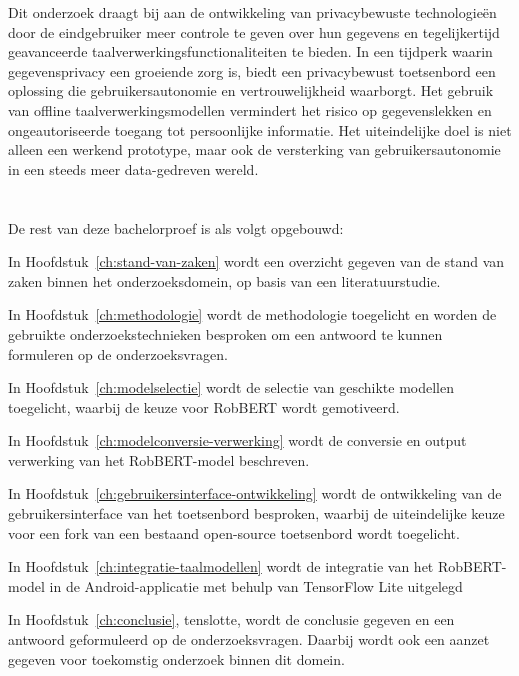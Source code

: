 Dit onderzoek draagt bij aan de ontwikkeling van privacybewuste technologieën door de eindgebruiker meer controle te geven over hun gegevens en tegelijkertijd geavanceerde taalverwerkingsfunctionaliteiten te bieden. In een tijdperk waarin gegevensprivacy een groeiende zorg is, biedt een privacybewust toetsenbord een oplossing die gebruikersautonomie en vertrouwelijkheid waarborgt. Het gebruik van offline taalverwerkingsmodellen vermindert het risico op gegevenslekken en ongeautoriseerde toegang tot persoonlijke informatie. Het uiteindelijke doel is niet alleen een werkend prototype, maar ook de versterking van gebruikersautonomie in een steeds meer data-gedreven wereld.

\section{}%
\label{sec:opzet-bachelorproef}


De rest van deze bachelorproef is als volgt opgebouwd:

In Hoofdstuk~\ref{ch:stand-van-zaken} wordt een overzicht gegeven van de stand van zaken binnen het onderzoeksdomein, op basis van een literatuurstudie.

In Hoofdstuk~\ref{ch:methodologie} wordt de methodologie toegelicht en worden de gebruikte onderzoekstechnieken besproken om een antwoord te kunnen formuleren op de onderzoeksvragen.

In Hoofdstuk~\ref{ch:modelselectie} wordt de selectie van geschikte modellen toegelicht, waarbij de keuze voor RobBERT wordt gemotiveerd.

In Hoofdstuk~\ref{ch:modelconversie-verwerking} wordt de conversie en output verwerking van het RobBERT-model beschreven.

In Hoofdstuk~\ref{ch:gebruikersinterface-ontwikkeling} wordt de ontwikkeling van de gebruikersinterface van het toetsenbord besproken, waarbij de uiteindelijke keuze voor een fork van een bestaand open-source toetsenbord wordt toegelicht.

In Hoofdstuk~\ref{ch:integratie-taalmodellen} wordt de integratie van het RobBERT-model in de Android-applicatie met behulp van TensorFlow Lite uitgelegd

In Hoofdstuk~\ref{ch:conclusie}, tenslotte, wordt de conclusie gegeven en een antwoord geformuleerd op de onderzoeksvragen. Daarbij wordt ook een aanzet gegeven voor toekomstig onderzoek binnen dit domein.